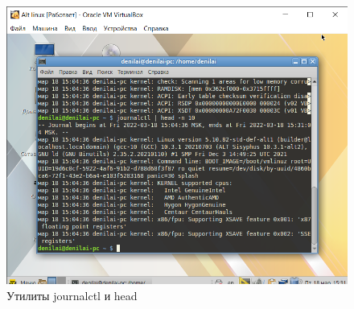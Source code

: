 \documentclass[a4paper,14pt]{extarticle}
\begin{document}
\begin{figure}[h!]
	\centering
	\includegraphics[width=0.7\linewidth]{"images/Практика МИРЭА/Alt linux [Работает] - Oracle VM VirtualBox 18.03.2022 15_31_08"}
	\caption{Утилиты journalctl и head}
	\label{fig:journalctl}
\end{figure}
\end{document}
